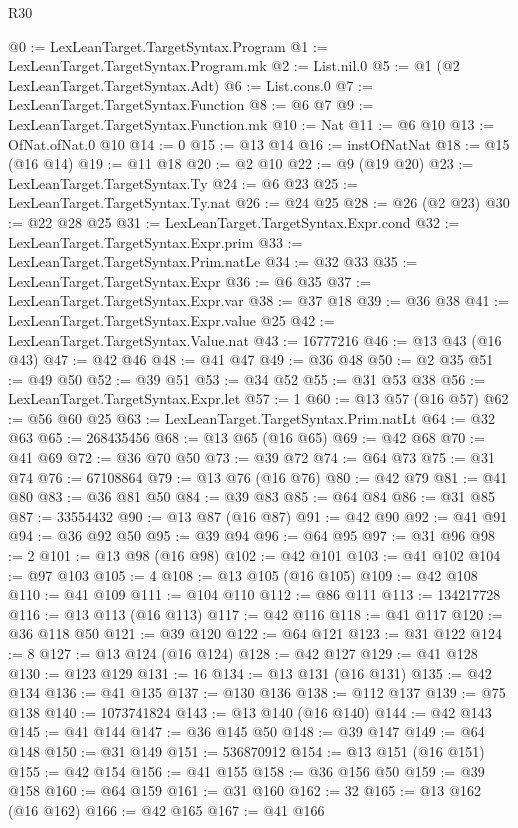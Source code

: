 \begin{lexlean}{R30}
\begin{coremodule}
@0 := LexLeanTarget.TargetSyntax.Program
@1 := LexLeanTarget.TargetSyntax.Program.mk
@2 := List.nil.{0}
@5 := @1 (@2 LexLeanTarget.TargetSyntax.Adt)
@6 := List.cons.{0}
@7 := LexLeanTarget.TargetSyntax.Function
@8 := @6 @7
@9 := LexLeanTarget.TargetSyntax.Function.mk
@10 := Nat
@11 := @6 @10
@13 := OfNat.ofNat.{0} @10
@14 := 0
@15 := @13 @14
@16 := instOfNatNat
@18 := @15 (@16 @14)
@19 := @11 @18
@20 := @2 @10
@22 := @9 (@19 @20)
@23 := LexLeanTarget.TargetSyntax.Ty
@24 := @6 @23
@25 := LexLeanTarget.TargetSyntax.Ty.nat
@26 := @24 @25
@28 := @26 (@2 @23)
@30 := @22 @28 @25
@31 := LexLeanTarget.TargetSyntax.Expr.cond
@32 := LexLeanTarget.TargetSyntax.Expr.prim
@33 := LexLeanTarget.TargetSyntax.Prim.natLe
@34 := @32 @33
@35 := LexLeanTarget.TargetSyntax.Expr
@36 := @6 @35
@37 := LexLeanTarget.TargetSyntax.Expr.var
@38 := @37 @18
@39 := @36 @38
@41 := LexLeanTarget.TargetSyntax.Expr.value @25
@42 := LexLeanTarget.TargetSyntax.Value.nat
@43 := 16777216
@46 := @13 @43 (@16 @43)
@47 := @42 @46
@48 := @41 @47
@49 := @36 @48
@50 := @2 @35
@51 := @49 @50
@52 := @39 @51
@53 := @34 @52
@55 := @31 @53 @38
@56 := LexLeanTarget.TargetSyntax.Expr.let
@57 := 1
@60 := @13 @57 (@16 @57)
@62 := @56 @60 @25
@63 := LexLeanTarget.TargetSyntax.Prim.natLt
@64 := @32 @63
@65 := 268435456
@68 := @13 @65 (@16 @65)
@69 := @42 @68
@70 := @41 @69
@72 := @36 @70 @50
@73 := @39 @72
@74 := @64 @73
@75 := @31 @74
@76 := 67108864
@79 := @13 @76 (@16 @76)
@80 := @42 @79
@81 := @41 @80
@83 := @36 @81 @50
@84 := @39 @83
@85 := @64 @84
@86 := @31 @85
@87 := 33554432
@90 := @13 @87 (@16 @87)
@91 := @42 @90
@92 := @41 @91
@94 := @36 @92 @50
@95 := @39 @94
@96 := @64 @95
@97 := @31 @96
@98 := 2
@101 := @13 @98 (@16 @98)
@102 := @42 @101
@103 := @41 @102
@104 := @97 @103
@105 := 4
@108 := @13 @105 (@16 @105)
@109 := @42 @108
@110 := @41 @109
@111 := @104 @110
@112 := @86 @111
@113 := 134217728
@116 := @13 @113 (@16 @113)
@117 := @42 @116
@118 := @41 @117
@120 := @36 @118 @50
@121 := @39 @120
@122 := @64 @121
@123 := @31 @122
@124 := 8
@127 := @13 @124 (@16 @124)
@128 := @42 @127
@129 := @41 @128
@130 := @123 @129
@131 := 16
@134 := @13 @131 (@16 @131)
@135 := @42 @134
@136 := @41 @135
@137 := @130 @136
@138 := @112 @137
@139 := @75 @138
@140 := 1073741824
@143 := @13 @140 (@16 @140)
@144 := @42 @143
@145 := @41 @144
@147 := @36 @145 @50
@148 := @39 @147
@149 := @64 @148
@150 := @31 @149
@151 := 536870912
@154 := @13 @151 (@16 @151)
@155 := @42 @154
@156 := @41 @155
@158 := @36 @156 @50
@159 := @39 @158
@160 := @64 @159
@161 := @31 @160
@162 := 32
@165 := @13 @162 (@16 @162)
@166 := @42 @165
@167 := @41 @166

\end{coremodule}
\end{lexlean}

